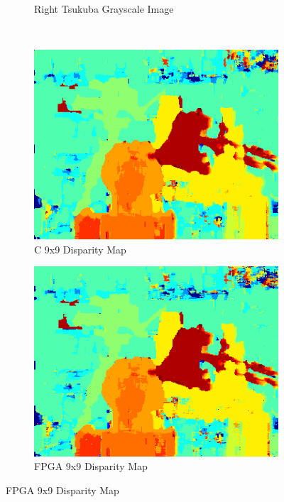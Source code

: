 \begin{figure}
\begin{center}
\begin{subfigure}{0.45\textwidth}
		\caption{Right Tsukuba Grayscale Image}
		\label{fig:tsukubaR}
	\end{subfigure}
	\\
	\begin{subfigure}{0.45\textwidth}
		\includegraphics[width=\textwidth]{figures/tsukuba_c_9x9.png}
		\caption{C 9x9 Disparity Map}
		\label{fig:tsukubaC9x9}
	\end{subfigure}
	\begin{subfigure}{0.45\textwidth}
		\includegraphics[width=\textwidth]{figures/tsukuba_buffer_9x9_4.png}
		\caption{FPGA 9x9 Disparity Map}
		\label{fig:tsukubaFPGA9x9}
	\end{subfigure}

\end{center}
\end{figure}
